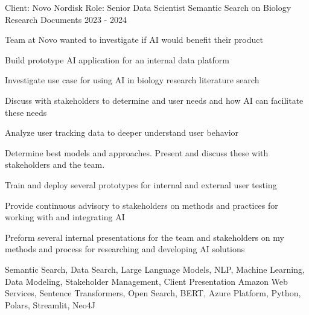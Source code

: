 


\begin{cventries}


\cventry
{Client: Novo Nordisk \newline Role: Senior Data Scientist} %
{Semantic Search on Biology Research Documents} %
{}%
{2023 - 2024} %
{ %
\begin{cvitems}
\item {Team at Novo wanted to investigate if AI would benefit their product}
\item {Build prototype AI application for an internal data platform}
\item {Investigate use case for using AI in biology research literature search}
\item {Discuss with stakeholders to determine and user needs and how AI can facilitate these needs}
\item {Analyze user tracking data to deeper understand user behavior}
\item {Determine best models and approaches. Present and discuss these with stakeholders and the team.}
\item {Train and deploy several prototypes for internal and external user testing}
\item {Provide continuous advisory to stakeholders on methods and practices for working with and integrating AI}
\item {Preform several internal presentations for the team and stakeholders on my methods and process for researching and developing AI solutions}
\end{cvitems}
\cventrykeywords
{Semantic Search, Data Search, Large Language Models, NLP, Machine Learning, Data Modeling, Stakeholder Management, Client Presentation}
{Amazon Web Services, Sentence Transformers, Open Search, BERT, Azure Platform, Python, Polars, Streamlit, Neo4J}
}


\end{cventries}
